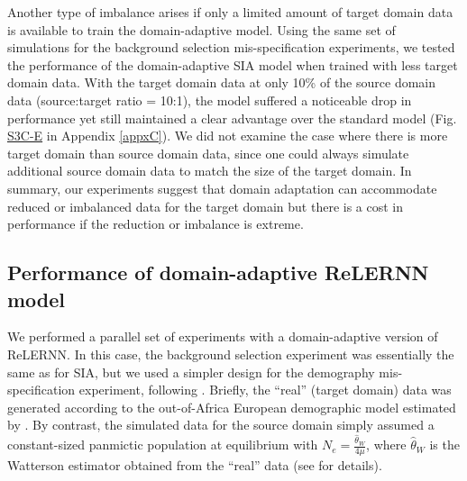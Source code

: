 Another type of imbalance arises if only a limited amount of target domain data is available to train the domain-adaptive model. Using the same set of simulations for the background selection mis-specification experiments, we tested the performance of the domain-adaptive \ac{SIA} model when trained with less target domain data. With the target domain data at only 10\% of the source domain data (source:target ratio = 10:1), the model suffered a noticeable drop in performance yet still maintained a clear advantage over the standard model (Fig. \href{https://journals.plos.org/plosgenetics/article?id=10.1371/journal.pgen.1011032\#sec018}{S3C-E} in Appendix \ref{appxC}). We did not examine the case where there is more target domain than source domain data, since one could always simulate additional source domain data to match the size of the target domain. In summary, our experiments suggest that domain adaptation can accommodate reduced or imbalanced data for the target domain but there is a cost in performance if the reduction or imbalance is extreme.

\subsection{Performance of domain-adaptive ReLERNN model}
We performed a parallel set of experiments with a domain-adaptive version of ReLERNN. In this case, the background selection experiment was essentially the same as for \ac{SIA}, but we used a simpler design for the demography mis-specification experiment, following \cite{adrion_predicting_2020}. Briefly, the “real” (target domain) data was generated according to the out-of-Africa European demographic model estimated by \cite{tennessen_evolution_2012}. By contrast, the simulated data for the source domain simply assumed a constant-sized panmictic population at equilibrium with $N_e=\frac{\hat{\theta}_W}{4\mu}$, where  $\hat{\theta}_W$ is the Watterson estimator obtained from the “real” data (see  for details).

